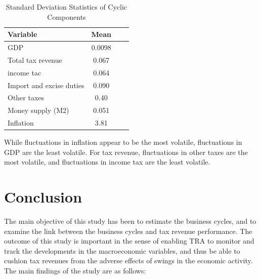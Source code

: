 \documentclass[12pt,a4paper,final]{article}
\begin{document}
\begin{table}[h]
\centering
\begin{small} 
\caption{Standard Deviation Statistics of Cyclic Components} 
\label{sumstat}
\begin{tabular}{l c c  c}
\toprule
\multicolumn{1}{l}{\textbf{Variable}} & \textbf{Mean}\\ 
 \midrule
GDP & 0.0098\\ 
Total tax revenue & 0.067 \\
income tac & 0.064 \\
Import and excise duties & 0.090\\
Other taxes  & 0.40\\
Money supply (M2) & 0.051 \\
Inflation & 3.81\\
\bottomrule
\end{tabular}
\end{small}
\end{table}

While fluctuations in inflation appear to be the most volatile, fluctuations in GDP are the least volatile.  For tax revenue, fluctuations in other taxes are the most volatile, and fluctuations in income tax are the least volatile. 

\section{Conclusion}

The main objective of this study has been to estimate the business cycles, and to examine the link between the business cycles and tax revenue performance. The outcome of this study is important in the sense of enabling TRA to monitor and track the developments in the macroeconomic variables, and thus be able to cushion tax revenues from the adverse effects of swings in the economic activity. The main findings of the study are as follows:
\end{document}
